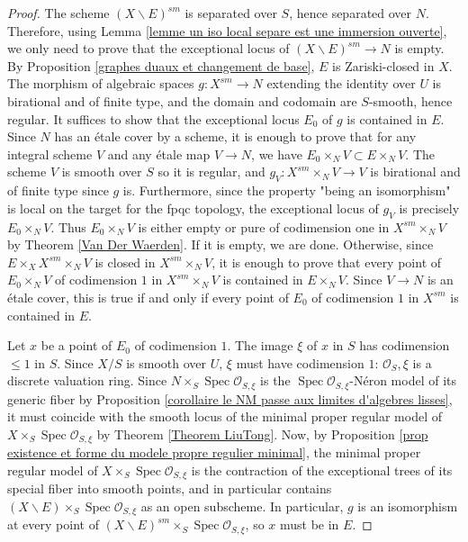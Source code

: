 \documentclass[a4paper,12pt]{amsart} %
\numberwithin{equation}{subsection}
\newcommand{\Spec}{\operatorname{Spec}}
\theoremstyle{definition}
\theoremstyle{plain}%
\theoremstyle{remark}
\renewcommand{\O}{\mathcal{O}}
\begin{document}
\begin{proof}
The scheme $(X\backslash E)^{sm}$ is separated over $S$, hence separated over $N$. Therefore, using Lemma \ref{lemme un iso local separe est une immersion ouverte}, we only need to prove that the exceptional locus of $(X\backslash E)^{sm}\to N$ is empty. By Proposition \ref{graphes duaux et changement de base}, $E$ is Zariski-closed in $X$. The morphism of algebraic spaces $g:X^{sm}\to N$ extending the identity over $U$ is birational and of finite type, and the domain and codomain are $S$-smooth, hence regular. It suffices to show that the exceptional locus $E_0$ of $g$ is contained in $E$. Since $N$ has an étale cover by a scheme, it is enough to prove that for any integral scheme $V$ and any étale map $V \rightarrow N$, we have $E_0\times_N V\subset E\times_N V$. The scheme $V$ is smooth over $S$ so it is regular, and $g_V:X^{sm}\times_N V\to V$ is birational and of finite type since $g$ is. Furthermore, since the property "being an isomorphism" is local on the target for the fpqc topology, the exceptional locus of $g_V$ is precisely $E_0\times_N V$. Thus $E_0\times_N V$ is either empty or pure of codimension one in $X^{sm}\times_N V$ by Theorem \ref{Van Der Waerden}. If it is empty, we are done. Otherwise, since $E\times_X X^{sm}\times_N V$ is closed in $X^{sm}\times_N V$, it is enough to prove that every point of $E_0\times_N V$ of codimension $1$ in $X^{sm}\times_N V$ is contained in $E\times_N V$. Since $V\to N$ is an \'etale cover, this is true if and only if every point of $E_0$ of codimension $1$ in $X^{sm}$ is contained in $E$.

Let $x$ be a point of $E_0$ of codimension $1$. The image $\xi$ of $x$ in $S$ has codimension $\leq 1$ in $S$. Since $X/S$ is smooth over $U$, $\xi$ must have codimension $1$: $\O_S,\xi$ is a discrete valuation ring. Since $N\times_S\Spec\O_{S,\xi}$ is the $\Spec\O_{S,\xi}$-N\'eron model of its generic fiber by Proposition \ref{corollaire le NM passe aux limites d'algebres lisses}, it must coincide with the smooth locus of the minimal proper regular model of $X\times_S\Spec\O_{S,\xi}$ by Theorem \ref{Theorem LiuTong}. Now, by Proposition \ref{prop existence et forme du modele propre regulier minimal}, the minimal proper regular model of $X\times_S\Spec\O_{S,\xi}$ is the contraction of the exceptional trees of its special fiber into smooth points, and in particular contains $(X\backslash E)\times_S\Spec\O_{S,\xi}$ as an open subscheme. In particular, $g$ is an isomorphism at every point of $(X\backslash E)^{sm}\times_S\Spec\O_{S,\xi}$, so $x$ must be in $E$.
\end{proof}
\end{document}
